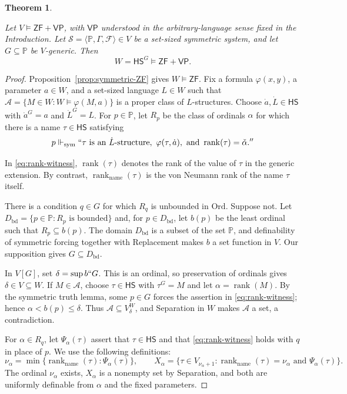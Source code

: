 \documentclass[11pt,a4paper]{amsart}
\newcommand{\VP}{\mathsf{VP}}
\newcommand{\ZF}{\mathsf{ZF}}
\newcommand{\HS}{\mathsf{HS}}
\newcommand{\Ord}{\mathrm{Ord}}
\newcommand{\rank}{\operatorname{rank}}
\newcommand{\namerank}{\operatorname{rank}_{\mathrm{name}}}
\newcommand{\forcesS}{\Vdash_{\mathrm{sym}}}
\theoremstyle{plain}
\newtheorem{theorem}{Theorem}[section]
\theoremstyle{definition}
\theoremstyle{remark}
\begin{document}
\begin{theorem}\label{thm:preservation}

Let $V\models\ZF+\VP$, with $\VP$ understood in the arbitrary-language sense fixed in the Introduction.  Let $\mathscr S=\langle\mathbb P,\Gamma,\mathcal F\rangle\in V$ be a set-sized symmetric system, and let $G\subseteq\mathbb P$ be $V$-generic.  Then
\[
W=\HS^G\models\ZF+\VP.
\]
\end{theorem}

\begin{proof}

Proposition~\ref{prop:symmetric-ZF} gives $W\models\ZF$.  Fix a formula $\varphi(x,y)$, a parameter $a\in W$, and a set-sized language $L\in W$ such that
$\mathcal A=\{M\in W:W\models\varphi(M,a)\}$ is a proper class of $L$-structures.  Choose $\dot a,\dot L\in\HS$ with $\dot a^G=a$ and $\dot L^G=L$.  For $p\in\mathbb P$, let $R_p$ be the class of ordinals $\alpha$ for which there is a name $\tau\in\HS$ satisfying
\begin{equation}\label{eq:rank-witness}
p\forcesS ``\tau\text{ is an }\dot L\text{-structure},\ \varphi(\tau,\dot a),
\text{ and }\rank(\tau)=\check\alpha.''
\end{equation}

{In \eqref{eq:rank-witness}, $\rank(\tau)$ denotes the rank of the value of $\tau$ in the generic extension.  By contrast, $\namerank(\tau)$ is the von Neumann rank of the name $\tau$ itself.}

There is a condition $q\in G$ for which $R_q$ is unbounded in $\Ord$.  Suppose not.  Let $D_{\mathrm{bd}}=\{p\in\mathbb P:R_p\text{ is bounded}\}$ and, for $p\in D_{\mathrm{bd}}$, let $b(p)$ be the least ordinal such that $R_p\subseteq b(p)$.  The domain $D_{\mathrm{bd}}$ is a subset of the set $\mathbb P$, and definability of symmetric forcing together with Replacement makes $b$ a set function in $V$.  Our supposition gives $G\subseteq D_{\mathrm{bd}}$.

In $V[G]$, set $\delta=\sup b``G$.  This is an ordinal, so preservation of ordinals gives $\delta\in V\subseteq W$.  If $M\in\mathcal A$, choose $\tau\in\HS$ with $\tau^G=M$ and let $\alpha=\rank(M)$.  By the symmetric truth lemma, some $p\in G$ forces the assertion in \eqref{eq:rank-witness}; hence $\alpha<b(p)\leq\delta$.  Thus $\mathcal A\subseteq V_\delta^W$, and Separation in $W$ makes $\mathcal A$ a set, a contradiction.

For $\alpha\in R_q$, let $\Psi_\alpha(\tau)$ assert that $\tau\in\HS$ and that \eqref{eq:rank-witness} holds with $q$ in place of $p$.  We use the following definitions:
\[
\nu_\alpha=\min\{\namerank(\tau):\Psi_\alpha(\tau)\},
\qquad
X_\alpha=\{\tau\in V_{\nu_\alpha+1}:\namerank(\tau)=\nu_\alpha
\text{ and }\Psi_\alpha(\tau)\}.
\]
{The ordinal $\nu_\alpha$ exists, $X_\alpha$ is a nonempty set by Separation, and both are uniformly definable from $\alpha$ and the fixed parameters.}


\end{proof}
\end{document}
